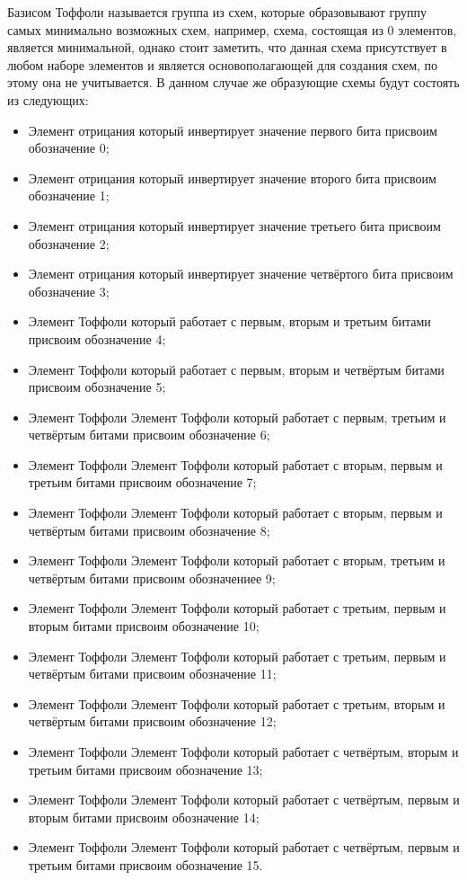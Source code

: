 \documentclass[14pt]{extarticle} %
\begin{document}
Базисом Тоффоли называется группа из схем, которые образовывают группу самых минимально возможных схем, например, схема, состоящая из 0 элементов, является минимальной, однако стоит заметить, что данная схема присутствует в любом наборе элементов и является основополагающей для создания схем, по этому она не учитывается.  В данном случае же образующие схемы будут состоять из следующих:

\begin{itemize}
	\item Элемент отрицания который инвертирует значение первого  бита присвоим обозначение 0;
	\item Элемент отрицания который инвертирует значение второго  бита присвоим обозначение 1;
	\item Элемент отрицания который инвертирует значение третьего  бита присвоим обозначение 2;
	\item Элемент отрицания который инвертирует значение четвёртого бита присвоим обозначение 3;
	\item Элемент Тоффоли который работает с первым, вторым и третьим битами присвоим обозначение 4;
	\item Элемент Тоффоли который работает с первым, вторым и четвёртым битами присвоим обозначение 5;
	\item Элемент Тоффоли Элемент Тоффоли который работает с первым, третьим и четвёртым битами присвоим обозначение 6;
	\item Элемент Тоффоли Элемент Тоффоли который работает с вторым, первым и третьим битами присвоим обозначение 7;
	\item Элемент Тоффоли Элемент Тоффоли который работает с вторым, первым и четвёртым битами присвоим обозначение 8;
	\item Элемент Тоффоли Элемент Тоффоли который работает с вторым, третьим и четвёртым битами присвоим обозначениее 9;
	\item Элемент Тоффоли Элемент Тоффоли который работает с третьим, первым и вторым битами присвоим обозначение 10;
	\item Элемент Тоффоли Элемент Тоффоли который работает с третьим, первым и четвёртым битами присвоим обозначение 11;
	\item Элемент Тоффоли Элемент Тоффоли который работает с третьим, вторым и четвёртым битами присвоим обозначение 12;
	\item Элемент Тоффоли Элемент Тоффоли который работает с четвёртым, вторым и третьим битами присвоим обозначение 13;
	\item Элемент Тоффоли Элемент Тоффоли который работает с четвёртым, первым и вторым битами присвоим обозначение 14;
	\item  Элемент Тоффоли Элемент Тоффоли который работает с четвёртым, первым и третьим битами присвоим обозначение 15.
\end{itemize}
\end{document}
